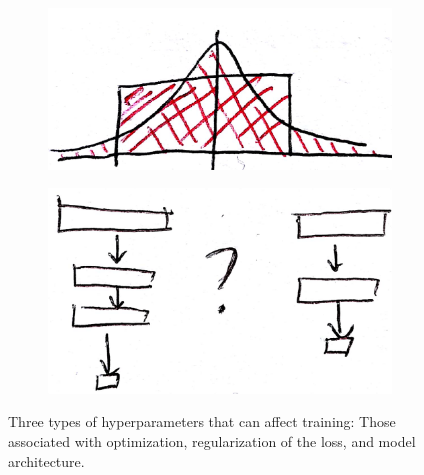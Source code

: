 \documentclass[10pt,mathserif]{beamer}
\begin{document}
\begin{frame}
\begin{figure}[ht]
\begin{subfigure}{.2\paperwidth}
    \end{subfigure}
    \begin{subfigure}{.2\paperwidth}
      \centering
      \includegraphics[width=0.17\paperwidth]{figure/weight_initialization}
    \end{subfigure}
    \begin{subfigure}{.2\paperwidth}
      \centering
      \includegraphics[width=0.17\paperwidth]{figure/architecture_choice}
    \end{subfigure}
    \caption{Three types of hyperparameters that can affect training: Those
      associated with optimization, regularization of the loss, and model
      architecture.
    \label{fig:hyperparameters} }
\end{figure}
\end{frame}
\end{document}
